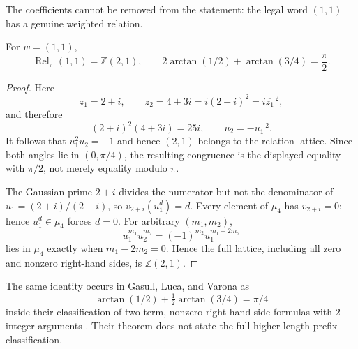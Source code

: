 The coefficients cannot be removed from the statement: the legal word
$(1,1)$ has a genuine weighted relation.

\begin{theorem}
\label{thm:collatz-machin-exceptional-seed}
For $w=(1,1)$,
\begin{equation}
\label{eq:collatz-machin-seed}
 \operatorname{Rel}_{\pi}(1,1)=\mathbb Z(2,1),
 \qquad
 2\arctan(1/2)+\arctan(3/4)=\frac{\pi}{2}.
\end{equation}
\end{theorem}

\begin{proof}
Here
\[
 z_1=2+i,\qquad z_2=4+3i=i(2-i)^2=i\overline{z_1}^{\,2},
\]
and therefore
\[
 (2+i)^2(4+3i)=25i,\qquad u_2=-u_1^{-2}.
\]
It follows that $u_1^2u_2=-1$ and hence $(2,1)$ belongs to the relation
lattice.  Since both angles lie in $(0,\pi/4)$, the resulting congruence is
the displayed equality with $\pi/2$, not merely equality modulo $\pi$.

The Gaussian prime $2+i$ divides the numerator but not the denominator of
$u_1=(2+i)/(2-i)$, so $v_{2+i}(u_1^d)=d$.  Every element of $\mu_4$ has
$v_{2+i}=0$; hence $u_1^d\in\mu_4$ forces $d=0$.  For arbitrary $(m_1,m_2)$,
\[
 u_1^{m_1}u_2^{m_2}=(-1)^{m_2}u_1^{m_1-2m_2}
\]
lies in $\mu_4$ exactly when $m_1-2m_2=0$.  Hence the full lattice, including
all zero and nonzero right-hand sides, is $\mathbb Z(2,1)$.
\end{proof}

The same identity occurs in Gasull, Luca, and Varona as
\[
 \arctan(1/2)+\tfrac12\arctan(3/4)=\pi/4
\]
inside their classification of two-term, nonzero-right-hand-side formulas
with $2$-integer arguments \cite[Theorem~1]{GasullLucaVarona2023}.  Their
theorem does not state the full higher-length prefix classification.

